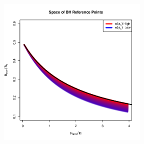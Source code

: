 \documentclass[ xcolor = pdftex, dvipsnames, table ]{beamer}
\begin{document}
%
\begin{frame}
\includegraphics[width=0.54\textwidth]{../../ddBias/rpSpaceww.png}
\end{frame}
\end{document}
